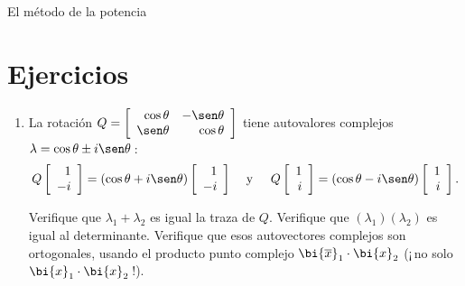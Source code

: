 \begin{entrega}{El método de la potencia}
\medskip
{}
\end{entrega}

\section{Ejercicios}

\begin{enumerate}
    \item La rotación $Q=\left[\begin{array}{rr}
\cos\theta&-\sen\theta\\
\sen\theta&\cos\theta
\end{array}\right]$ tiene autovalores complejos $\lambda=\cos\theta\pm i\sen\theta$\,:
 $$Q\left[\begin{array}{r}1\\-i\end{array}\right]=(\cos\theta+i\sen\theta)\left[\begin{array}{r}1\\-i\end{array}\right]
 \quad\text{ y\; }\quad
 Q\left[\begin{array}{r}1\\i\end{array}\right]=(\cos\theta-i\sen\theta)\left[\begin{array}{r}1\\i\end{array}\right].$$

\noindent
Verifique que $\lambda_1+\lambda_2$ es igual la traza de $Q$. Verifique que $(\lambda_1)(\lambda_2)$ es igual al determinante. Verifique que esos autovectores complejos son ortogonales, usando el producto punto complejo $\bi{\overline{x}}_1\cdot\bi{x}_2$ (¡\,no solo $\bi{x}_1\cdot\bi{x}_2$\,!).


\end{enumerate}
